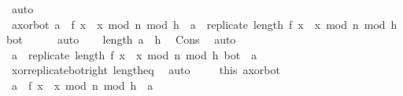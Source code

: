 \begin{isabellebody}
\ auto\isanewline
\isanewline
\ \ \ \isamarkupfalse%
\ a{\isacharunderscore}{\kern0pt}xor{\isacharunderscore}{\kern0pt}bot{\isacharcolon}{\kern0pt}\ {\isachardoublequoteopen}{\isacharquery}{\kern0pt}a{\isacharprime}{\kern0pt}\ {\isacharbrackleft}{\kern0pt}{\isasymoplus}{\isacharbrackright}{\kern0pt}\ {\isacharquery}{\kern0pt}f\ {\isacharparenleft}{\kern0pt}x\ {\isacharasterisk}{\kern0pt}\ x\ mod\ n\ mod\ {}{\isacharcircum}{\kern0pt}h{\isacharparenright}{\kern0pt}\ {\isacharequal}{\kern0pt}\ a\ {\isacharbrackleft}{\kern0pt}{\isasymoplus}{\isacharbrackright}{\kern0pt}\ {\isacharparenleft}{\kern0pt}replicate\ {\isacharparenleft}{\kern0pt}length\ {\isacharparenleft}{\kern0pt}{\isacharquery}{\kern0pt}f\ {\isacharparenleft}{\kern0pt}x\ {\isacharasterisk}{\kern0pt}\ x\ mod\ n\ mod\ {}{\isacharcircum}{\kern0pt}h{\isacharparenright}{\kern0pt}{\isacharparenright}{\kern0pt}{\isacharparenright}{\kern0pt}\ bot{\isacharparenright}{\kern0pt}{\isachardoublequoteclose}\isanewline
\ \ \ \ \isamarkupfalse%
\ auto\isanewline
\isanewline
\ \ \isamarkupfalse%
\ {\isachardoublequoteopen}length\ a\ {\isasymle}\ h{\isachardoublequoteclose}\ \isamarkupfalse%
\ Cons{\isacharparenleft}{\kern0pt}{}{\isacharparenright}{\kern0pt}\ \isamarkupfalse%
\ auto\isanewline
\ \ \isamarkupfalse%
\ \isamarkupfalse%
\ {\isachardoublequoteopen}a\ {\isacharbrackleft}{\kern0pt}{\isasymoplus}{\isacharbrackright}{\kern0pt}\ {\isacharparenleft}{\kern0pt}replicate\ {\isacharparenleft}{\kern0pt}length\ {\isacharparenleft}{\kern0pt}{\isacharquery}{\kern0pt}f\ {\isacharparenleft}{\kern0pt}x\ {\isacharasterisk}{\kern0pt}\ x\ mod\ n\ mod\ {}{\isacharcircum}{\kern0pt}h{\isacharparenright}{\kern0pt}{\isacharparenright}{\kern0pt}{\isacharparenright}{\kern0pt}\ bot{\isacharparenright}{\kern0pt}\ {\isacharequal}{\kern0pt}\ a{\isachardoublequoteclose}\ \isanewline
\ \ \ \ \isamarkupfalse%
\ xor{\isacharunderscore}{\kern0pt}replicate{\isacharunderscore}{\kern0pt}bot{\isacharunderscore}{\kern0pt}right\ length{\isacharunderscore}{\kern0pt}eq\ \isamarkupfalse%
\ auto\ \isanewline
\isanewline
\ \ \isamarkupfalse%
\ this\ a{\isacharunderscore}{\kern0pt}xor{\isacharunderscore}{\kern0pt}bot\ \isamarkupfalse%
\ {\isachardoublequoteopen}{\isacharquery}{\kern0pt}a{\isacharprime}{\kern0pt}\ {\isacharbrackleft}{\kern0pt}{\isasymoplus}{\isacharbrackright}{\kern0pt}\ {\isacharquery}{\kern0pt}f\ {\isacharparenleft}{\kern0pt}x\ {\isacharasterisk}{\kern0pt}\ x\ mod\ n\ mod\ {}{\isacharcircum}{\kern0pt}h{\isacharparenright}{\kern0pt}\ {\isacharequal}{\kern0pt}\ a{\isachardoublequoteclose}\ \isamarkupfalse%

\end{isabellebody}
